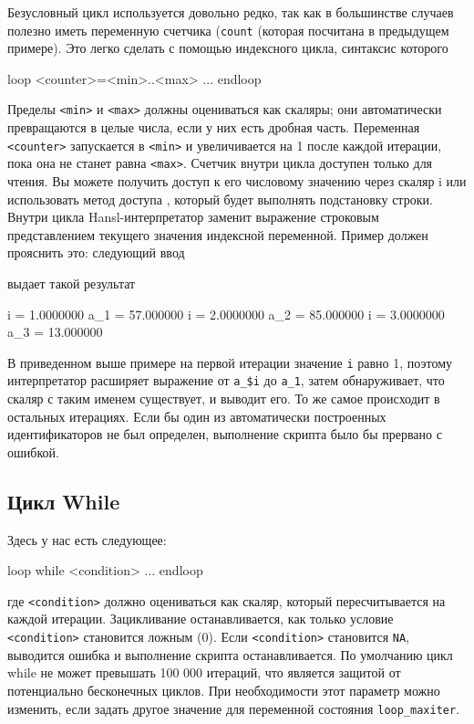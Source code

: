 Безусловный цикл используется довольно редко, так как в большинстве
случаев полезно иметь переменную счетчика (\texttt{count} (которая
посчитана в предыдущем примере). Это легко сделать с помощью
индексного цикла, синтаксис которого
\begin{code}
loop <counter>=<min>..<max>
   ...
endloop
\end{code}
Пределы \texttt{<min>} и \texttt{<max>} должны оцениваться как
скаляры; они автоматически превращаются в целые числа, если у них есть
дробная часть. Переменная \texttt{<counter>} запускается в
\texttt{<min>} и увеличивается на 1 после каждой итерации, пока она не
станет равна \texttt{<max>}.  Счетчик внутри цикла доступен только для
чтения. Вы можете получить доступ к его числовому значению через
скаляр i или использовать метод доступа , который будет
выполнять подстановку строки. Внутри цикла Hansl-интерпретатор заменит
выражение  строковым представлением текущего значения
индексной переменной. Пример должен прояснить это: следующий ввод


выдает такой результат
\begin{code}
    i = 1.0000000
  a_1 = 57.000000
    i = 2.0000000
  a_2 = 85.000000
    i = 3.0000000
  a_3 = 13.000000
\end{code}

В приведенном выше примере на первой итерации значение \texttt{i}
равно 1, поэтому интерпретатор расширяет выражение от \verb|a_$i|  до
\verb|a_1|, затем обнаруживает, что скаляр с таким именем существует,
и выводит его. То же самое происходит в остальных итерациях. Если бы
один из автоматически построенных идентификаторов не был определен,
выполнение скрипта было бы прервано с ошибкой.

\subsection{Цикл While}

Здесь у нас есть следующее:
\begin{code}
loop while <condition>
   ...
endloop
\end{code}
где \texttt{<condition>} должно оцениваться как скаляр, который
пересчитывается на каждой итерации. Зацикливание останавливается, как
только условие \texttt{<condition>} становится ложным (0). Если
\texttt{<condition>} становится \texttt{NA}, выводится ошибка и
выполнение скрипта останавливается. По умолчанию цикл while не может
превышать 100 000 итераций, что является защитой от потенциально
бесконечных циклов. При необходимости этот параметр можно изменить,
если задать другое значение для переменной состояния
\texttt{loop\_maxiter}.

